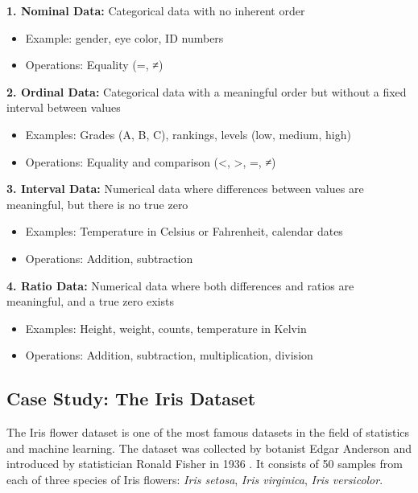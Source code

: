 \documentclass[
]{book}
\providecommand{\tightlist}{%
  \setlength{\itemsep}{0pt}\setlength{\parskip}{0pt}}
\begin{document}
\textbf{1. Nominal Data:} Categorical data with no inherent order

\begin{itemize}
\tightlist
\item
  Example: gender, eye color, ID numbers
\item
  Operations: Equality (=, ≠)
\end{itemize}

\textbf{2. Ordinal Data:} Categorical data with a meaningful order but without a fixed interval between values

\begin{itemize}
\tightlist
\item
  Examples: Grades (A, B, C), rankings, levels (low, medium, high)
\item
  Operations: Equality and comparison (\textless, \textgreater, =, ≠)
\end{itemize}

\textbf{3. Interval Data:} Numerical data where differences between values are meaningful, but there is no true zero

\begin{itemize}
\tightlist
\item
  Examples: Temperature in Celsius or Fahrenheit, calendar dates
\item
  Operations: Addition, subtraction
\end{itemize}

\textbf{4. Ratio Data:} Numerical data where both differences and ratios are meaningful, and a true zero exists

\begin{itemize}
\tightlist
\item
  Examples: Height, weight, counts, temperature in Kelvin
\item
  Operations: Addition, subtraction, multiplication, division
\end{itemize}

\subsection{Case Study: The Iris Dataset}\label{case-study-the-iris-dataset}

The Iris flower dataset is one of the most famous datasets in the field of statistics and machine learning. The dataset was collected by botanist Edgar Anderson and introduced by statistician Ronald Fisher in 1936 \citep{fisher1936}. It consists of 50 samples from each of three species of Iris flowers: \emph{Iris setosa}, \emph{Iris virginica}, \emph{Iris versicolor}.
\end{document}
